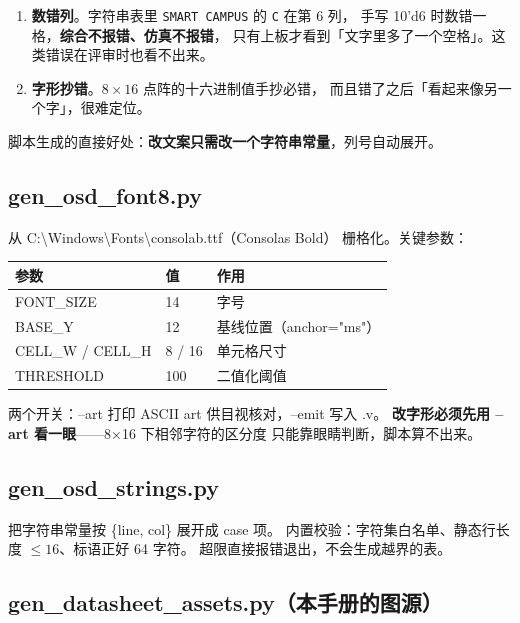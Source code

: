 \documentclass[10pt,a4paper]{article}
\newcommand{\sig}[1]{{\ttfamily\small #1}}
\newcommand{\code}[1]{{\ttfamily\small #1}}
\begin{document}
\begin{enumerate}
\item \textbf{数错列}。字符串表里 \texttt{SMART CAMPUS} 的 \texttt{C} 在第 6 列，
      手写 \code{10'd6} 时数错一格，\textbf{综合不报错、仿真不报错}，
      只有上板才看到「文字里多了一个空格」。这类错误在评审时也看不出来。
\item \textbf{字形抄错}。$8\times16$ 点阵的十六进制值手抄必错，
      而且错了之后「看起来像另一个字」，很难定位。
\end{enumerate}

脚本生成的直接好处：\textbf{改文案只需改一个字符串常量}，列号自动展开。

\subsection{\sig{gen\_osd\_font8.py}}

从 \code{C:\textbackslash Windows\textbackslash Fonts\textbackslash consolab.ttf}（Consolas Bold）
栅格化。关键参数：

\begin{center}\small
\begin{tabular}{@{}l l l@{}}
\toprule
\textbf{参数} & \textbf{值} & \textbf{作用}\\
\midrule
\code{FONT\_SIZE} & 14 & 字号\\
\code{BASE\_Y} & 12 & 基线位置（\code{anchor="ms"}）\\
\code{CELL\_W} / \code{CELL\_H} & 8 / 16 & 单元格尺寸\\
\code{THRESHOLD} & 100 & 二值化阈值\\
\bottomrule
\end{tabular}
\end{center}

两个开关：\code{--art} 打印 ASCII art 供目视核对，\code{--emit} 写入 \sig{.v}。
\textbf{改字形必须先用 \code{--art} 看一眼}——8×16 下相邻字符的区分度
只能靠眼睛判断，脚本算不出来。

\subsection{\sig{gen\_osd\_strings.py}}

把字符串常量按 \code{\{line, col\}} 展开成 \code{case} 项。
内置校验：字符集白名单、静态行长度 $\le16$、标语正好 64 字符。
超限直接报错退出，不会生成越界的表。

\subsection{\sig{gen\_datasheet\_assets.py}（本手册的图源）}
\end{document}
